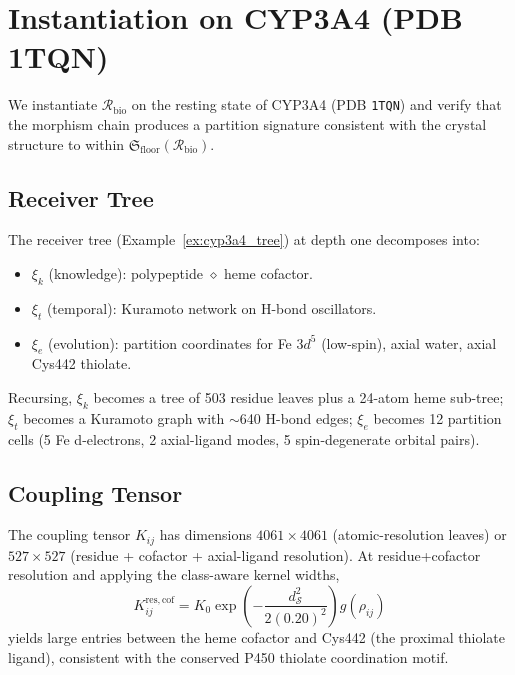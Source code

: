 \documentclass[11pt,twocolumn,a4paper]{article}
\theoremstyle{definition}
\theoremstyle{remark}
\newcommand{\Sspace}{\mathcal{S}}
\newcommand{\Recv}{\mathcal{R}}
\newcommand{\Floor}{{\mathfrak{S}_{\mathrm{floor}}}}
\newcommand{\Sexp}{\xi}
\begin{document}
\section{Instantiation on CYP3A4 (PDB 1TQN)}
\label{sec:cyp3a4}

We instantiate $\Recv_{\mathrm{bio}}$ on the resting state of CYP3A4 (PDB \texttt{1TQN}) and verify that the morphism chain produces a partition signature consistent with the crystal structure to within $\Floor(\Recv_{\mathrm{bio}})$.

\subsection{Receiver Tree}

The receiver tree (Example~\ref{ex:cyp3a4_tree}) at depth one decomposes into:
\begin{itemize}[nosep]
    \item $\Sexp_k$ (knowledge): polypeptide $\diamond$ heme cofactor.
    \item $\Sexp_t$ (temporal): Kuramoto network on H-bond oscillators.
    \item $\Sexp_e$ (evolution): partition coordinates for Fe $3d^5$ (low-spin), axial water, axial Cys442 thiolate.
\end{itemize}
Recursing, $\Sexp_k$ becomes a tree of 503 residue leaves plus a 24-atom heme sub-tree; $\Sexp_t$ becomes a Kuramoto graph with $\sim$640 H-bond edges; $\Sexp_e$ becomes 12 partition cells (5 Fe d-electrons, 2 axial-ligand modes, 5 spin-degenerate orbital pairs).

\subsection{Coupling Tensor}

The coupling tensor $K_{ij}$ has dimensions $4061 \times 4061$ (atomic-resolution leaves) or $527 \times 527$ (residue + cofactor + axial-ligand resolution). At residue+cofactor resolution and applying the class-aware kernel widths,
\begin{equation}
K_{ij}^{\mathrm{res,cof}} = K_0 \exp\!\left(-\frac{d_\Sspace^2}{2(0.20)^2}\right) g(\rho_{ij})
\end{equation}
yields large entries between the heme cofactor and Cys442 (the proximal thiolate ligand), consistent with the conserved P450 thiolate coordination motif.
\end{document}
